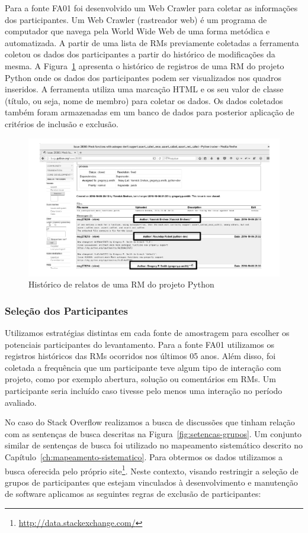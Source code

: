 Para a fonte FA01 foi desenvolvido um Web Crawler para coletar as informações
dos participantes. Um Web Crawler (rastreador web) é um programa de computador
que navega pela World Wide Web de uma forma metódica e automatizada.  A partir
de uma lista de RMs previamente coletadas a ferramenta coletou os dados dos
participantes a partir do histórico de modificações da mesma. A
Figura~\ref{fig:historico-rm-python} apresenta o histórico de registros de uma
RM do projeto Python onde os dados dos participantes podem ser visualizados nos
quadros inseridos. A ferramenta utiliza uma marcação HTML e os seu valor de
classe (título, ou seja, nome de membro) para coletar os dados. Os dados
coletados também foram armazenadas em um banco de dados para posterior aplicação
de critérios de inclusão e exclusão.

\begin{figure}[htpb]
	\centering
	\includegraphics[width=0.6\linewidth]{./chapter-pesquisa-com-profissionais/img/historico-rm-python.pdf}
	\caption{Histórico de relatos de uma RM do projeto Python}
\label{fig:historico-rm-python}
\end{figure}

\subsubsection{Seleção dos Participantes}
\label{subsubsec:pesquisa_profissionais_plano_pesquisa}

Utilizamos estratégias distintas em cada fonte de amostragem para escolher os
potenciais participantes do levantamento. Para a fonte FA01 utilizamos os
registros históricos das RMs ocorridos nos últimos 05 anos. Além disso, foi
coletada a frequência que um participante teve algum tipo de interação com
projeto, como por exemplo abertura, solução ou comentários em RMs. Um
participante seria incluído caso tivesse pelo menos uma interação no período
avaliado.

No caso do Stack Overflow realizamos a busca de discussões que tinham relação
com as sentenças de busca descritas na Figura~\ref{fig:setencas-grupos}. Um
conjunto similar de sentenças de busca foi utilizado no mapeamento sistemático
descrito no Capítulo~\ref{ch:mapeamento-sistematico}. Para obtermos os dados
utilizamos a busca oferecida pelo próprio
site\footnote{\url{http://data.stackexchange.com/}}. Neste contexto, visando
restringir a seleção de grupos de participantes que estejam vinculados à
desenvolvimento e manutenção de software aplicamos as seguintes regras de
exclusão de participantes:


